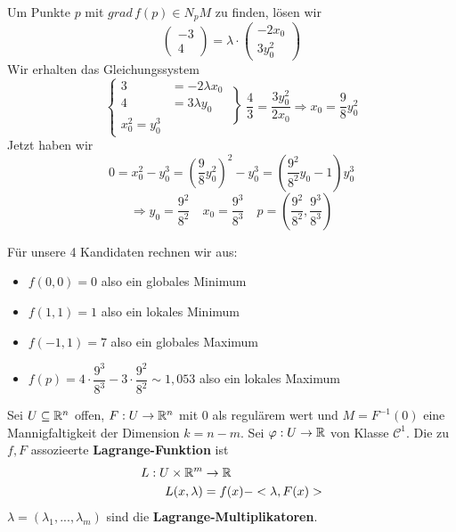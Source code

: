 \documentclass[main.tex]{subfiles}
\begin{document}
\begin{Beispiel}
  Um Punkte $p$ mit $grad \, f(p) \in N_p M$ zu finden, lösen wir
  $$\begin{pmatrix}
      -3 \\ 4
    \end{pmatrix} = \lambda \cdot \begin{pmatrix}
        -2x_0 \\ 3 y_0^2
    \end{pmatrix}$$
    Wir erhalten das Gleichungssystem
    $$\left\{\begin{aligned}
      3 & = -2 \lambda x_0 \\
      4 & = 3 \lambda y_0 \\
      x_0^2 = y_0^3
    \end{aligned}\right.  \left\} \dfrac{4}{3} = \dfrac{3 y_0^2}{2 x_0} \right. \Rightarrow x_0 = \dfrac{9}{8} y_0^2$$
    Jetzt haben wir
    $$0 = x_0^2 - y_0^3 = \left(\dfrac{9}{8} y_0^2\right)^2 - y_0^3 =  \left(\dfrac{9^2}{8^2} y_0 - 1\right) y_0^3$$
    $$\Rightarrow y_0 = \dfrac{9^2}{8^2} \quad x_0 = \dfrac{9^3}{8^3} \quad p=\left(\dfrac{9^2}{8^2},\dfrac{9^3}{8^3}\right)$$
  \item Für unsere 4 Kandidaten rechnen wir aus:
    \begin{itemize}
      \item $f(0,0) = 0$ also ein globales Minimum
      \item $f(1,1) = 1$ also ein lokales Minimum
      \item $f(-1,1) = 7$ also ein globales Maximum
      \item $f(p) = 4 \cdot \dfrac{9^3}{8^3} - 3 \cdot \dfrac{9^2}{8^2} \sim 1,053$ also ein lokales Maximum
    \end{itemize}
\end{Beispiel}

\begin{Definition}
  Sei $U \subseteq \mathbb{R}^n$ offen, $F: U \to \mathbb{R}^n$ mit $0$ als regulärem wert und $M = F^{-1}(0)$ eine Mannigfaltigkeit der Dimension $k = n-m$. Sei $\varphi: U \to \mathbb{R}$ von Klasse $\mathcal{C}^1$. Die zu $f, F$ assozieerte \textbf{Lagrange-Funktion} ist
  $$\begin{aligned}
    L:U \times \mathbb{R}^m & \to \mathbb{R} \\
    L(x,\lambda) & = f(x) - <\lambda, F(x)>
  \end{aligned}$$
  $\lambda = (\lambda_1,...,\lambda_m)$ sind die \textbf{Lagrange-Multiplikatoren}.
\end{Definition}
\end{document}
